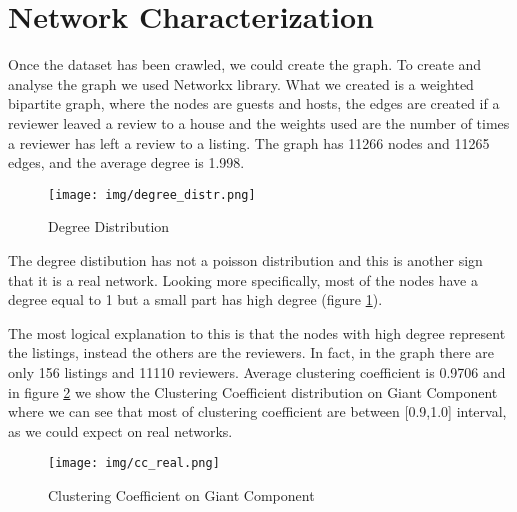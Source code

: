 \documentclass[sigchi]{acmart}
\begin{document}
\section{Network Characterization} \label{sec3}
Once the dataset has been crawled, we could create the graph. To create and analyse the graph we used Networkx library. \newline
What we created is a weighted bipartite graph, where the nodes are guests and hosts, the edges are created if a reviewer leaved a review to a house and the weights used are the number of times a reviewer has left a review to a listing. The graph has 11266 nodes and 11265 edges, and the average degree is 1.998.
\begin{figure}[h]
  \centering
  \texttt{[image: img/degree\_distr.png]}
  \caption{Degree Distribution}
  \label{dd_real}
  
\end{figure}
The degree distibution has not a poisson distribution and this is another sign that it is a real network.
Looking more specifically, most of the nodes have a degree equal to 1 but a small part has high degree (figure \ref{dd_real}).

The most logical explanation to this is that the nodes with high degree represent the listings, instead the others are the reviewers. In fact, in the graph there are only 156 listings and 11110 reviewers. \newline
Average clustering coefficient is 0.9706 and in  figure \ref{cc_real} we show the Clustering Coefficient distribution on Giant Component where we can see that most of clustering coefficient are between [0.9,1.0] interval, as we could expect on real networks.
\begin{figure}[h]
  \centering
  \texttt{[image: img/cc\_real.png]}
  \caption{Clustering Coefficient on Giant Component}
  \label{cc_real}
  
\end{figure}
\end{document}
